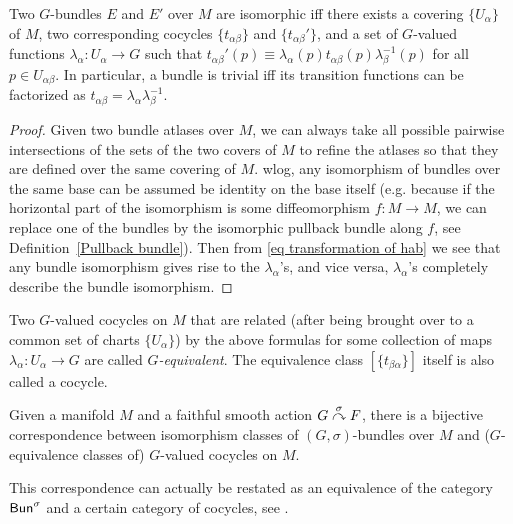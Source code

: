 \begin{thm}\label{bundle isomorphism thm}
Two $G$-bundles $E$ and $E'$ over $M$ are isomorphic iff there exists a covering $\{U_\alpha \}$ of $M$, two corresponding cocycles $\{t_{\alpha\beta}\}$ and $\{t_{\alpha\beta}'\}$, and a set of $G$-valued functions $\lambda_\alpha:U_\alpha\to G$ such that $t_{\alpha\beta}'(p)\equiv \lambda_\alpha (p) t_{\alpha\beta}(p) \lambda_\beta^{-1}(p)$ for all $p\in U_{\alpha\beta}$. In particular, a bundle is trivial iff its transition functions can be factorized as $t_{\alpha\beta}=\lambda_\alpha \lambda_\beta^{-1}$.
\end{thm}
\begin{proof}
Given two bundle atlases over $M$, we can always take all possible pairwise intersections of the sets of the two covers of $M$ to refine the atlases so that they are defined over the same covering of $M$. \gls{wlog}, any isomorphism of bundles over the same base can be assumed be identity on the base itself (e.g. because if the horizontal part of the isomorphism is some diffeomorphism $f:M\to M$, we can replace one of the bundles by the isomorphic pullback bundle along $f$, see Definition~\ref{Pullback bundle}). Then from \eqref{eq transformation of hab} we see that any bundle isomorphism gives rise to the $\lambda_\alpha$'s, and vice versa, $\lambda_\alpha$'s completely describe the bundle isomorphism. 
\end{proof}
\begin{defn}
    Two $G$-valued cocycles on $M$ that are related (after being brought over to a common set of charts $\{U_\alpha\}$) by the above formulas for some collection of maps $\lambda_\alpha:U_\alpha\to G$ are called \emph{$G$-equivalent}. The equivalence class $[\{t_{\beta\alpha}\}]$ itself is also called a cocycle.
\end{defn}
\begin{cor}
    Given a manifold $M$ and a faithful smooth action $G\overset{\sigma}{\curvearrowright} F$, there is a bijective correspondence between isomorphism classes of $(G,\sigma)$-bundles over $M$ and ($G$-equivalence classes of) $G$-valued cocycles on $M$.
\end{cor}
This correspondence can actually be restated as an equivalence of the category $\mathsf{Bun}^\sigma$ and a certain category of cocycles, see \cite{Vakar}.

